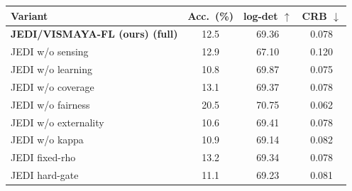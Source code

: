 \begin{tabular}{@{}l c c c@{}}
\toprule
Variant & Acc.\ (\%) & log-det $\uparrow$ & CRB $\downarrow$ \\
\midrule
\textbf{JEDI/VISMAYA-FL (ours) (full)} & 12.5 & 69.36 & 0.078 \\
\midrule
JEDI w/o sensing & 12.9 & 67.10 & 0.120 \\
JEDI w/o learning & 10.8 & 69.87 & 0.075 \\
JEDI w/o coverage & 13.1 & 69.37 & 0.078 \\
JEDI w/o fairness & 20.5 & 70.75 & 0.062 \\
JEDI w/o externality & 10.6 & 69.41 & 0.078 \\
JEDI w/o kappa & 10.9 & 69.14 & 0.082 \\
JEDI fixed-rho & 13.2 & 69.34 & 0.078 \\
JEDI hard-gate & 11.1 & 69.23 & 0.081 \\
\bottomrule
\end{tabular}